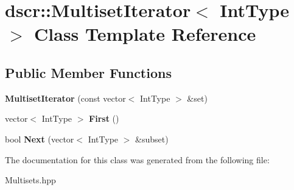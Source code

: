 \hypertarget{classdscr_1_1_multiset_iterator}{\section{dscr\-:\-:Multiset\-Iterator$<$ Int\-Type $>$ Class Template Reference}
\label{classdscr_1_1_multiset_iterator}
}
\subsection*{Public Member Functions}
\begin{DoxyCompactItemize}
\item 
\hypertarget{classdscr_1_1_multiset_iterator_a43d3c22455ac3c16d5027d5cd19bd25a}{{\bfseries Multiset\-Iterator} (const vector$<$ Int\-Type $>$ \&set)}\label{classdscr_1_1_multiset_iterator_a43d3c22455ac3c16d5027d5cd19bd25a}

\item 
\hypertarget{classdscr_1_1_multiset_iterator_af89df10a2aad59f668ad76aa689ee3fb}{vector$<$ Int\-Type $>$ {\bfseries First} ()}\label{classdscr_1_1_multiset_iterator_af89df10a2aad59f668ad76aa689ee3fb}

\item 
\hypertarget{classdscr_1_1_multiset_iterator_a270310aa2441fbd3181efb66eea9e1f6}{bool {\bfseries Next} (vector$<$ Int\-Type $>$ \&subset)}\label{classdscr_1_1_multiset_iterator_a270310aa2441fbd3181efb66eea9e1f6}

\end{DoxyCompactItemize}


The documentation for this class was generated from the following file\-:\begin{DoxyCompactItemize}
\item 
Multisets.\-hpp\end{DoxyCompactItemize}
